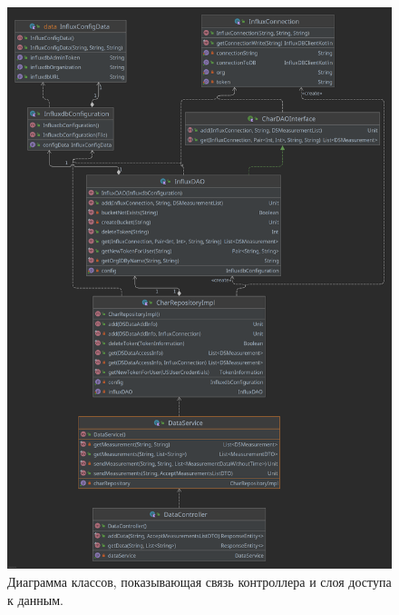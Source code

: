 \begin{figure}[hbtp]
	\centering
	\includegraphics[width=\textwidth]{img/dataAndControllerLinkageDiagram.png}
	\caption{Диаграмма классов, показывающая связь контроллера и слоя доступа к данным. }
	\label{fig:dataAndController}
\end{figure}

